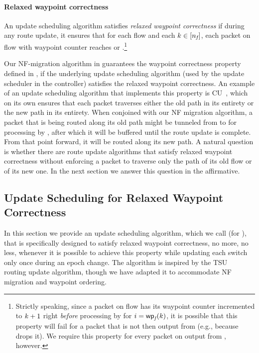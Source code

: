 \paragraph{Relaxed waypoint correctness} An update scheduling algorithm
satisfies \textit{relaxed waypoint correctness} if during any route
update, it ensures that for each flow \flowID{} and each $\wpIdx \in
\nats{\wpNmbr{\flowID{}}}$, each packet on flow \flowID{} with
waypoint counter \wpIdx reaches \oldSwitchID{\wpFn{\flowID{}}{\wpIdx}}
or \newSwitchID{\wpFn{\flowID{}}(\wpIdx)}.\footnote{Strictly speaking,
  since a packet on flow \flowID{} has its waypoint counter
  incremented to $k+1$ right \textit{before} processing by
  \nfID{\nfIdx} for $\nfIdx = \wpFn{\flowID{}}(\wpIdx)$, it is
  possible that this property will fail for a packet that is not then
  output from \nfID{\nfIdx} (e.g., because \nfID{\nfIdx} drops it).
  We require this property for every packet on \flowID{} output from
  \nfID{\nfIdx}, however.}

\medskip

Our NF-migration algorithm in  guarantees the waypoint correctness property defined in , if the underlying update scheduling algorithm (used by the update scheduler in the controller) satisfies the relaxed waypoint correctness.
An example of an update scheduling algorithm that implements this
property is CU~\cite{CU}, which on its own ensures that each packet
traverses either the old path in its entirety or the new path in its
entirety.  When conjoined with our NF migration algorithm, a packet
that is being routed along its old path might be tunneled from
\oldSwitchID{\nfIdx} to \newSwitchID{\nfIdx} for processing by
\nfID{\nfIdx}, after which it will be buffered until the route update
is complete.  From that point forward, it will be routed along its new
path.  A natural question is whether there are route update algorithms
that satisfy relaxed waypoint correctness without enforcing a packet
to traverse only the path of its old flow or of its new one.  In
the next section we answer this question in the affirmative.

%


\subsection{Update Scheduling for Relaxed Waypoint Correctness}
\label{sec:schedule:rwc}

In this section we provide an update scheduling algorithm, which we
call \ourRouteUpdateName (for \ourRouteUpdateNameLong), that is
specifically designed to satisfy relaxed waypoint correctness, no
more, no less, whenever it is possible to achieve this property while
updating each switch only once during an epoch change.  The algorithm
is inspired by the TSU~\cite{tsu} routing update algorithm, though we
have adapted it to accommodate NF migration and waypoint ordering.

